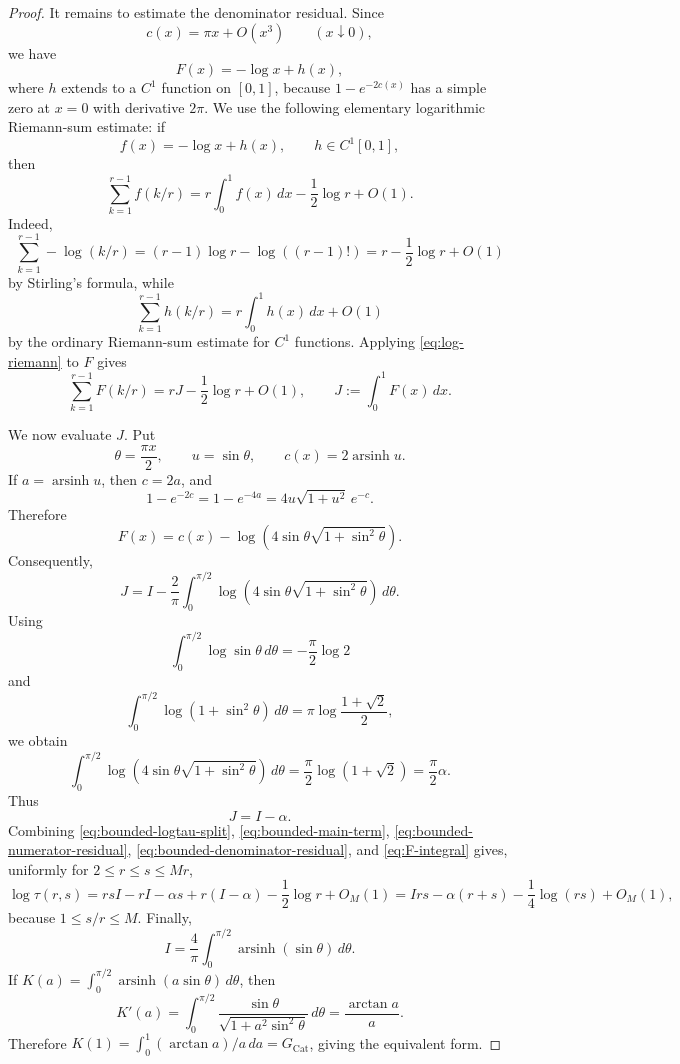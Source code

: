 \documentclass[11pt]{article}
\numberwithin{equation}{section}
\DeclareMathOperator{\arsinh}{arsinh}
\newcommand{\dd}{\,d}
\begin{document}
\begin{proof}
It remains to estimate the denominator residual. Since
\[
  c(x)=\pi x+O(x^3)
  \qquad (x\downarrow0),
\]
we have
\[
  F(x)=-\log x+h(x),
\]
where $h$ extends to a $C^1$ function on $[0,1]$, because $1-e^{-2c(x)}$ has a simple zero at $x=0$ with derivative $2\pi$. We use the following elementary logarithmic Riemann-sum estimate: if
\[
  f(x)=-\log x+h(x),
  \qquad h\in C^1[0,1],
\]
then
\begin{equation}\label{eq:log-riemann}
  \sum_{k=1}^{r-1}f(k/r)
  =
  r\int_0^1f(x)\dd x-\frac12\log r+O(1).
\end{equation}
Indeed,
\[
  \sum_{k=1}^{r-1}-\log(k/r)
  =
  (r-1)\log r-\log((r-1)!)
  =
  r-\frac12\log r+O(1)
\]
by Stirling's formula, while
\[
  \sum_{k=1}^{r-1}h(k/r)=r\int_0^1h(x)\dd x+O(1)
\]
by the ordinary Riemann-sum estimate for $C^1$ functions. Applying \eqref{eq:log-riemann} to $F$ gives
\begin{equation}\label{eq:bounded-denominator-residual}
  \sum_{k=1}^{r-1}F(k/r)=rJ-\frac12\log r+O(1),
  \qquad
  J:=\int_0^1F(x)\dd x.
\end{equation}

We now evaluate $J$. Put
\[
  \theta=\frac{\pi x}{2},
  \qquad
  u=\sin\theta,
  \qquad
  c(x)=2\arsinh u.
\]
If $a=\arsinh u$, then $c=2a$, and
\[
  1-e^{-2c}=1-e^{-4a}
  =
  4u\sqrt{1+u^2}\,e^{-c}.
\]
Therefore
\[
  F(x)=c(x)-\log\left(4\sin\theta\sqrt{1+\sin^2\theta}\right).
\]
Consequently,
\[
  J
  =
  I-\frac2\pi\int_0^{\pi/2}
  \log\left(4\sin\theta\sqrt{1+\sin^2\theta}\right)\dd\theta.
\]
Using
\[
  \int_0^{\pi/2}\log\sin\theta\dd\theta
  =
  -\frac{\pi}{2}\log2
\]
and
\[
  \int_0^{\pi/2}\log(1+\sin^2\theta)\dd\theta
  =
  \pi\log\frac{1+\sqrt2}{2},
\]
we obtain
\[
  \int_0^{\pi/2}
  \log\left(4\sin\theta\sqrt{1+\sin^2\theta}\right)\dd\theta
  =
  \frac{\pi}{2}\log(1+\sqrt2)
  =
  \frac{\pi}{2}\alpha.
\]
Thus
\begin{equation}\label{eq:F-integral}
  J=I-\alpha.
\end{equation}
Combining \eqref{eq:bounded-logtau-split}, \eqref{eq:bounded-main-term}, \eqref{eq:bounded-numerator-residual}, \eqref{eq:bounded-denominator-residual}, and \eqref{eq:F-integral} gives, uniformly for $2\le r\le s\le Mr$,
\[
  \log \tau(r,s)
  =
  rsI-rI-\alpha s+r(I-\alpha)-\frac12\log r+O_M(1)
  =
  Irs-\alpha(r+s)-\frac14\log(rs)+O_M(1),
\]
because $1\le s/r\le M$.
Finally,
\[
  I=\frac4\pi\int_0^{\pi/2}\arsinh(\sin\theta)\dd\theta.
\]
If $K(a)=\int_0^{\pi/2}\arsinh(a\sin\theta)\dd\theta$, then
\[
  K'(a)=\int_0^{\pi/2}\frac{\sin\theta}{\sqrt{1+a^2\sin^2\theta}}\dd\theta
  =
  \frac{\arctan a}{a}.
\]
Therefore $K(1)=\int_0^1(\arctan a)/a\dd a=G_{\mathrm{Cat}}$, giving the equivalent form.
\end{proof}
\end{document}
